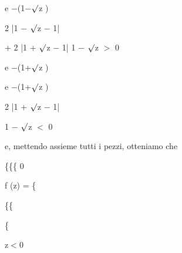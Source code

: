 \documentclass[a4paper,portrait,12pt]{article}
\begin{document}
\begin{flushleft}
e $-$(1$-$$\surd$z )
\end{flushleft}


\begin{flushleft}
2 |1 $-$ $\surd$z $-$ 1|
\end{flushleft}





\begin{flushleft}
+ 2 |1 + $\surd$z $-$ 1| 1 $-$ $\surd$z $>$ 0
\end{flushleft}





\begin{flushleft}
e $-$(1+$\surd$z )
\end{flushleft}





\begin{flushleft}
e $-$(1+$\surd$z )
\end{flushleft}


\begin{flushleft}
2 |1 + $\surd$z $-$ 1|
\end{flushleft}





\begin{flushleft}
1 $-$ $\surd$z $<$ 0
\end{flushleft}





\begin{flushleft}
e, mettendo assieme tutti i pezzi, otteniamo che
\end{flushleft}





\{\{\{ 0


\begin{flushleft}
f (z) = \{
\end{flushleft}


\{\{


\{





\begin{flushleft}
z$<$0
\end{flushleft}
\end{document}
